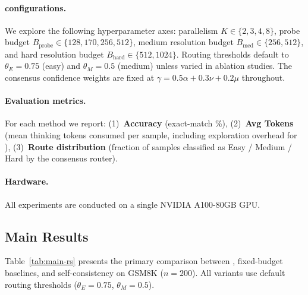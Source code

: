 \paragraph{\method{} configurations.}
We explore the following hyperparameter axes:
parallelism $K \in \{2, 3, 4, 8\}$,
probe budget $B_{\mathrm{probe}} \in \{128, 170, 256, 512\}$,
medium resolution budget $B_{\mathrm{med}} \in \{256, 512\}$, and
hard resolution budget $B_{\mathrm{hard}} \in \{512, 1024\}$.
Routing thresholds default to $\theta_E = 0.75$ (easy) and
$\theta_M = 0.5$ (medium) unless varied in ablation studies.
The consensus confidence weights are fixed at
$\gamma = 0.5\alpha + 0.3\nu + 0.2\mu$ throughout.

\paragraph{Evaluation metrics.}
For each method we report:
(1)~\textbf{Accuracy} (exact-match \%),
(2)~\textbf{Avg Tokens} (mean thinking tokens consumed per sample,
including exploration overhead for \method{}),
(3)~\textbf{Route distribution} (fraction of samples classified as
Easy / Medium / Hard by the consensus router).

\paragraph{Hardware.}
All experiments are conducted on a single NVIDIA A100-80GB GPU.

\subsection{Main Results}
\label{sec:exp:main}

Table~\ref{tab:main-rs} presents the primary comparison between
\method{}, fixed-budget baselines, and self-consistency on GSM8K
($n = 200$).
All \method{} variants use default routing thresholds
($\theta_E = 0.75$, $\theta_M = 0.5$).

